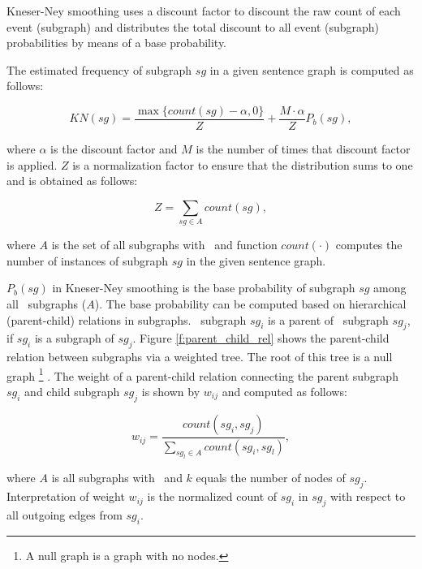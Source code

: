 \begin{figure*}[!t]
\centering
\small
\caption{parent child relation.} 
\label{f:parent_child_rel}
\end{figure*}

Kneser-Ney smoothing uses a discount factor to discount the raw count
of each event (subgraph) and distributes the total discount to all
event (subgraph) probabilities by means of a base probability.

The estimated frequency of subgraph $sg$ in a given sentence graph
is computed as follows:

\begin{equation*}
KN(sg) = \frac{\max \lbrace	 count(sg)-\alpha, 0 \rbrace }{Z} + \frac{M \cdot \alpha}{Z}P_b(sg),
\end{equation*}

\noindent
where $\alpha$ is the discount factor and $M$ is the number of times
that discount factor is applied. $Z$ is a normalization factor
to ensure that the distribution sums to one and is obtained as follows:

\begin{equation*}
Z = \sum_{sg \in A} count(sg),
\end{equation*}

\noindent
where $A$ is the set of all subgraphs with \knodes\ and function
$count(\cdot)$ computes the number of instances of subgraph $sg$ in
the given sentence graph.

$P_b(sg)$ in Kneser-Ney smoothing is the base probability of
subgraph $sg$ among all \knode\ subgraphs ($A$). The base
probability can be computed based on hierarchical (parent-child)
relations in subgraphs. \knode\ subgraph $sg_i$ is a parent
of \kplusnode\ subgraph $sg_j$, if $sg_i$ is a subgraph of
$sg_j$. Figure \ref{f:parent_child_rel} shows the parent-child
relation between subgraphs via a weighted tree. The root of this tree
is a null graph%
%
\footnote{A null graph is a graph with no nodes.}%
%
. The weight of a parent-child relation connecting the parent
subgraph $sg_i$ and child subgraph $sg_j$ is shown by $w_{ij}$ and
computed as follows:

\begin{equation*}
w_{ij} = \frac{count(sg_i, sg_j)}{\sum_{sg_l \in A}count(sg_i,sg_l)},
\end{equation*}

\noindent
where $A$ is all subgraphs with \knode\ and $k$ equals the number of
nodes of $sg_j$. Interpretation of weight $w_{ij}$ is the normalized count of $sg_i$ in $sg_j$ with respect to all outgoing edges from $sg_i$.

